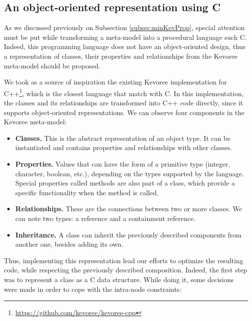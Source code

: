 \subsection{An object-oriented representation using C}
As we discussed previously on Subsection \ref{subsec:minKevProp}, special attention must be put while transforming a meta-model into a procedural language such C.
Indeed, this programming language does not have an object-oriented design, thus a representation of classes, their properties and relationships from the Kevoree meta-model should be proposed.

We took as a source of inspiration the existing Kevoree implementation for C++\footnote{\url{https://github.com/kevoree/kevoree-cpp}}, which is the closest language that match with C.
In this implementation, the classes and its relationships are transformed into C++ code directly, since it supports object-oriented representations.
We can observe four components in the Kevoree meta-model:

\begin{itemize}
	\item \textbf{Classes.} This is the abstract representation of an object type. It can be instantiated and contains properties and relationships with other classes.
	\item \textbf{Properties.} Values that can have the form of a primitive type (integer, character, boolean, etc.), depending on the types supported by the language. Special properties called methods are also part of a class, which provide a specific functionality when the method is called.
	\item \textbf{Relationships.} These are the connections between two or more classes. We can note two types: a reference and a containment reference.
	\item \textbf{Inheritance.} A class can inherit the previously described components from another one, besides adding its own.
\end{itemize}

Thus, implementing this representation lead our efforts to optimize the resulting code, while respecting the previously described composition.
Indeed, the first step was to represent a class as a C data structure.
While doing it, some decisions were made in order to cope with the intra-node constraints:


